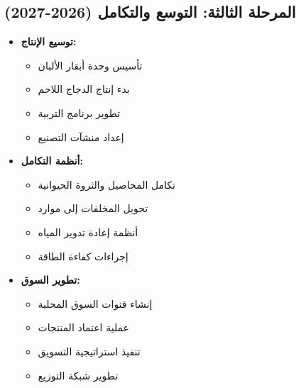 \subsection{المرحلة الثالثة: التوسع والتكامل (2026-2027)}
\begin{itemize}
    \item \textbf{توسيع الإنتاج:}
    \begin{itemize}
        \item تأسيس وحدة أبقار الألبان
        \item بدء إنتاج الدجاج اللاحم
        \item تطوير برنامج التربية
        \item إعداد منشآت التصنيع
    \end{itemize}
    
    \item \textbf{أنظمة التكامل:}
    \begin{itemize}
        \item تكامل المحاصيل والثروة الحيوانية
        \item تحويل المخلفات إلى موارد
        \item أنظمة إعادة تدوير المياه
        \item إجراءات كفاءة الطاقة
    \end{itemize}
    
    \item \textbf{تطوير السوق:}
    \begin{itemize}
        \item إنشاء قنوات السوق المحلية
        \item عملية اعتماد المنتجات
        \item تنفيذ استراتيجية التسويق
        \item تطوير شبكة التوزيع
    \end{itemize}
\end{itemize}

